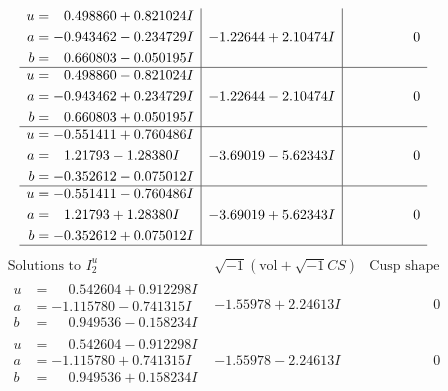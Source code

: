 \documentclass[1p]{elsarticle_modified}
\theoremstyle{definition}
\newcommand{\I}{\sqrt{-1}}
\begin{document}
$$\begin{array}{c|c|c}
\begin{aligned}
u &= \phantom{-}0.498860 + 0.821024 I \\
a &= -0.943462 - 0.234729 I \\
b &= \phantom{-}0.660803 - 0.050195 I\end{aligned}
 & -1.22644 + 2.10474 I & \phantom{-0.000000 } 0 \\ \hline\begin{aligned}
u &= \phantom{-}0.498860 - 0.821024 I \\
a &= -0.943462 + 0.234729 I \\
b &= \phantom{-}0.660803 + 0.050195 I\end{aligned}
 & -1.22644 - 2.10474 I & \phantom{-0.000000 } 0 \\ \hline\begin{aligned}
u &= -0.551411 + 0.760486 I \\
a &= \phantom{-}1.21793 - 1.28380 I \\
b &= -0.352612 - 0.075012 I\end{aligned}
 & -3.69019 - 5.62343 I & \phantom{-0.000000 } 0 \\ \hline\begin{aligned}
u &= -0.551411 - 0.760486 I \\
a &= \phantom{-}1.21793 + 1.28380 I \\
b &= -0.352612 + 0.075012 I\end{aligned}
 & -3.69019 + 5.62343 I & \phantom{-0.000000 } 0\\
 \hline 
 \end{array}$$\newpage$$\begin{array}{c|c|c}  
\text{Solutions to }I^u_{2}& \I (\text{vol} + \sqrt{-1}CS) & \text{Cusp shape}\\
 \hline 
\begin{aligned}
u &= \phantom{-}0.542604 + 0.912298 I \\
a &= -1.115780 - 0.741315 I \\
b &= \phantom{-}0.949536 - 0.158234 I\end{aligned}
 & -1.55978 + 2.24613 I & \phantom{-0.000000 } 0 \\ \hline\begin{aligned}
u &= \phantom{-}0.542604 - 0.912298 I \\
a &= -1.115780 + 0.741315 I \\
b &= \phantom{-}0.949536 + 0.158234 I\end{aligned}
 & -1.55978 - 2.24613 I & \phantom{-0.000000 } 0 \\ \hline\begin{aligned}

\end{aligned}
\end{array}$$
\end{document}
